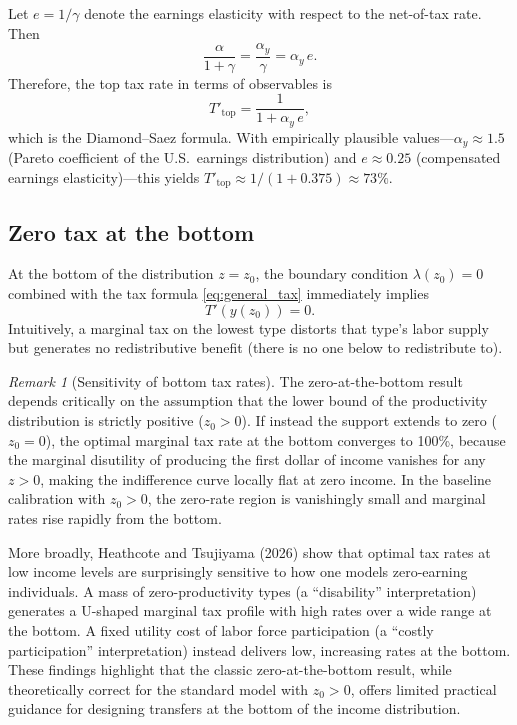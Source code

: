 \documentclass[12pt,a4paper]{article}
\theoremstyle{definition}
\theoremstyle{plain}
\theoremstyle{remark}
\newtheorem{remark}{Remark}[section]
\newcommand{\zlow}{z_{\scriptscriptstyle 0}}
\begin{document}
Let $e = 1/\gamma$ denote the earnings elasticity with respect to the net-of-tax rate. Then
\[
  \frac{\alpha}{1+\gamma} = \frac{\alpha_y}{\gamma} = \alpha_y \, e.
\]
Therefore, the top tax rate in terms of observables is
\begin{equation}
\label{eq:top_rate_DS}
  \boxed{
  T'_{\text{top}} = \frac{1}{1 + \alpha_y \, e},
  }
\end{equation}
which is the Diamond--Saez formula. With empirically plausible values---$\alpha_y \approx 1.5$ (Pareto coefficient of the U.S.\ earnings distribution) and $e \approx 0.25$ (compensated earnings elasticity)---this yields $T'_{\text{top}} \approx 1/(1 + 0.375) \approx 73\%$.

\subsection{Zero tax at the bottom}

At the bottom of the distribution $z = \zlow$, the boundary condition $\lambda(\zlow) = 0$ combined with the tax formula \eqref{eq:general_tax} immediately implies
\[
  T'(y(\zlow)) = 0.
\]
Intuitively, a marginal tax on the lowest type distorts that type's labor supply but generates no redistributive benefit (there is no one below to redistribute to).

\begin{remark}[Sensitivity of bottom tax rates]
The zero-at-the-bottom result depends critically on the assumption that the lower bound of the productivity distribution is strictly positive ($\zlow > 0$). If instead the support extends to zero ($\zlow = 0$), the optimal marginal tax rate at the bottom converges to 100\%, because the marginal disutility of producing the first dollar of income vanishes for any $z > 0$, making the indifference curve locally flat at zero income. In the baseline calibration with $\zlow > 0$, the zero-rate region is vanishingly small and marginal rates rise rapidly from the bottom.

More broadly, Heathcote and Tsujiyama (2026) show that optimal tax rates at low income levels are surprisingly sensitive to how one models zero-earning individuals. A mass of zero-productivity types (a ``disability'' interpretation) generates a U-shaped marginal tax profile with high rates over a wide range at the bottom. A fixed utility cost of labor force participation (a ``costly participation'' interpretation) instead delivers low, increasing rates at the bottom.  These findings highlight that the classic zero-at-the-bottom result, while theoretically correct for the standard model with $\zlow > 0$, offers limited practical guidance for designing transfers at the bottom of the income distribution.
\end{remark}
\end{document}
